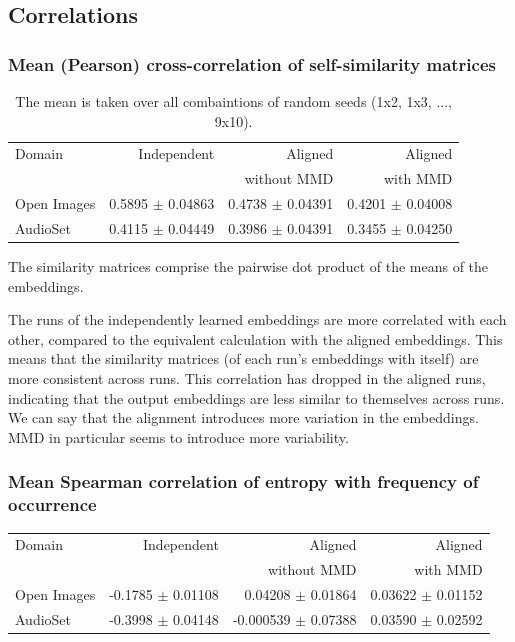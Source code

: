 \subsection{Correlations}
\subsubsection{Mean (Pearson) cross-correlation of self-similarity matrices}
\begin{table}[H]
\centering
\begin{tabular}{lrrr}
\toprule
Domain &   Independent & Aligned     &  Aligned  \\
       &               & without MMD &  with MMD \\
\midrule
Open Images    & 0.5895 $\pm$ 0.04863 & 0.4738 $\pm$ 0.04391 &     0.4201 $\pm$  0.04008 \\
AudioSet    & 0.4115 $\pm$ 0.04449 &  0.3986 $\pm$ 0.04391  &      0.3455  $\pm$ 0.04250  \\
\bottomrule
\end{tabular}
\caption{The mean is taken over all combaintions of random seeds (1x2, 1x3, ..., 9x10).}
\end{table}

The similarity matrices comprise the pairwise dot product of the means of the embeddings.

The runs of the independently learned embeddings are more correlated with each other, compared to the equivalent calculation with the aligned embeddings. This means that the similarity matrices (of each run's embeddings with itself) are more consistent across runs. This correlation has dropped in the aligned runs, indicating that the output embeddings are less similar to themselves across runs. We can say that the alignment introduces more variation in the embeddings. MMD in particular seems to introduce more variability. 

\subsubsection{Mean Spearman correlation of entropy with frequency of occurrence}
\begin{tabular}{lrrr}
\toprule
Domain &   Independent & Aligned     &  Aligned  \\
       &               & without MMD &  with MMD \\
\midrule
Open Images    &  -0.1785 $\pm$ 0.01108 & 0.04208 $\pm$ 0.01864 &     0.03622 $\pm$  0.01152 \\
AudioSet    &  -0.3998 $\pm$ 0.04148 & -0.000539 $\pm$   0.07388 &      0.03590  $\pm$ 0.02592  \\
\bottomrule
\end{tabular}\\

